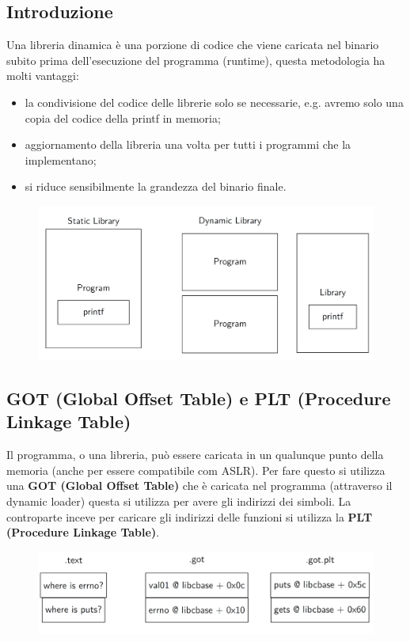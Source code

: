 \subsection{Introduzione}
Una libreria dinamica è una porzione di codice che viene caricata nel binario subito prima dell'esecuzione del programma (runtime), questa metodologia ha molti vantaggi:
\begin{itemize}
    \item la condivisione del codice delle librerie solo se necessarie, e.g. avremo solo una copia del codice della printf in memoria;
    \item aggiornamento della libreria una volta per tutti i programmi che la implementano;
    \item si riduce sensibilmente la grandezza del binario finale.
\end{itemize}

\begin{figure}[h!]
    \centering
    \includegraphics[width=.5\linewidth]{res/dynamic_libraries.png}
    \caption{}
\end{figure}

\subsection{GOT (Global Offset Table) e PLT (Procedure Linkage Table)}
Il programma, o una libreria, può essere caricata in un qualunque punto della memoria (anche per essere compatibile com ASLR).
Per fare questo si utilizza una \textbf{GOT (Global Offset Table)} che è caricata nel programma (attraverso il dynamic loader) questa si utilizza per avere gli indirizzi dei simboli.
La controparte inceve per caricare gli indirizzi delle funzioni si utilizza la \textbf{PLT (Procedure Linkage Table)}.

\begin{figure}[h!]
    \centering
    \includegraphics[width=.5\linewidth]{res/GOT_PLT.png}
    \caption{}
\end{figure}